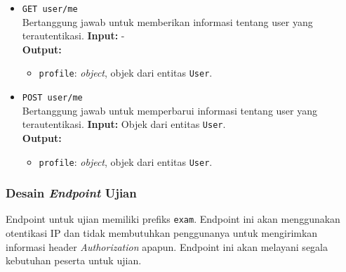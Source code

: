 \begin{itemize}
        \item \texttt{GET user/me} \\
            Bertanggung jawab untuk memberikan informasi tentang user yang
            terautentikasi. \textbf{Input:} -\\
            \textbf{Output:}
            \begin{itemize}
                \item \texttt{profile}: \textit{object}, objek dari entitas
                    \texttt{User}.
            \end{itemize}
            
        \item \texttt{POST user/me} \\
            Bertanggung jawab untuk memperbarui informasi tentang user yang
            terautentikasi. \textbf{Input:} Objek dari entitas \texttt{User}.\\
            \textbf{Output:}
            \begin{itemize}
                \item \texttt{profile}: \textit{object}, objek dari entitas
                    \texttt{User}.
            \end{itemize}
    \end{itemize}
    
\subsubsection{Desain \textit{Endpoint} Ujian} Endpoint untuk ujian memiliki
    prefiks \texttt{exam}. Endpoint ini akan menggunakan otentikasi IP dan tidak
    membutuhkan penggunanya untuk mengirimkan informasi header
    \textit{Authorization} apapun. Endpoint ini akan melayani segala kebutuhan
    peserta untuk ujian.
    
